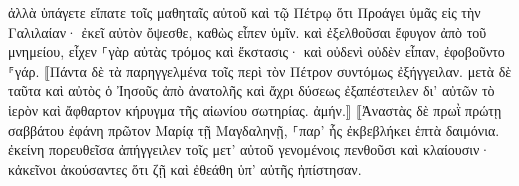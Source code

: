 \documentclass{openreader}
\begin{document}
ἀλλὰ ὑπάγετε εἴπατε τοῖς μαθηταῖς αὐτοῦ καὶ τῷ Πέτρῳ ὅτι Προάγει ὑμᾶς εἰς τὴν Γαλιλαίαν· ἐκεῖ αὐτὸν ὄψεσθε, καθὼς εἶπεν ὑμῖν. 
καὶ ἐξελθοῦσαι ἔφυγον ἀπὸ τοῦ μνημείου, εἶχεν ⸀γὰρ αὐτὰς τρόμος καὶ ἔκστασις· καὶ οὐδενὶ οὐδὲν εἶπαν, ἐφοβοῦντο ⸁γάρ. ⟦Πάντα δὲ τὰ παρηγγελμένα τοῖς περὶ τὸν Πέτρον συντόμως ἐξήγγειλαν. μετὰ δὲ ταῦτα καὶ αὐτὸς ὁ Ἰησοῦς ἀπὸ ἀνατολῆς καὶ ἄχρι δύσεως ἐξαπέστειλεν δι’ αὐτῶν τὸ ἱερὸν καὶ ἄφθαρτον κήρυγμα τῆς αἰωνίου σωτηρίας. ἀμήν.⟧ 
⟦Ἀναστὰς δὲ πρωῒ πρώτῃ σαββάτου ἐφάνη πρῶτον Μαρίᾳ τῇ Μαγδαληνῇ, ⸀παρ’ ἧς ἐκβεβλήκει ἑπτὰ δαιμόνια. 
ἐκείνη πορευθεῖσα ἀπήγγειλεν τοῖς μετ’ αὐτοῦ γενομένοις πενθοῦσι καὶ κλαίουσιν· 
κἀκεῖνοι ἀκούσαντες ὅτι ζῇ καὶ ἐθεάθη ὑπ’ αὐτῆς ἠπίστησαν. 
\end{document}
